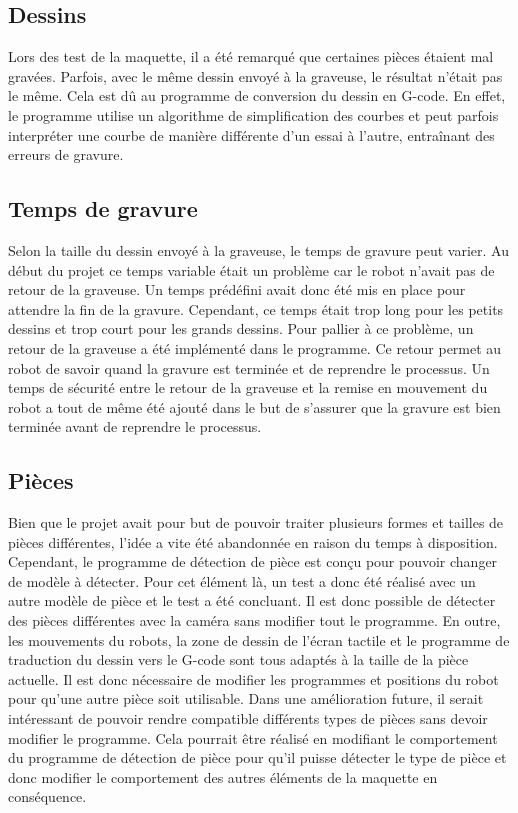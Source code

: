 \subsection{Dessins}
Lors des test de la maquette, il a été remarqué que certaines pièces étaient mal gravées. Parfois, avec le même dessin envoyé à la graveuse, le résultat n'était pas le même. Cela est dû au programme de conversion du dessin en G-code. En effet, le programme utilise un algorithme de simplification des courbes et peut parfois interpréter une courbe de manière différente d'un essai à l'autre, entraînant des erreurs de gravure.

\subsection{Temps de gravure}
Selon la taille du dessin envoyé à la graveuse, le temps de gravure peut varier. Au début du projet ce temps variable était un problème car le robot n'avait pas de retour de la graveuse. Un temps prédéfini avait donc été mis en place pour attendre la fin de la gravure. Cependant, ce temps était trop long pour les petits dessins et trop court pour les grands dessins. Pour pallier à ce problème, un retour de la graveuse a été implémenté dans le programme. Ce retour permet au robot de savoir quand la gravure est terminée et de reprendre le processus. Un temps de sécurité entre le retour de la graveuse et la remise en mouvement du robot a tout de même été ajouté dans le but de s'assurer que la gravure est bien terminée avant de reprendre le processus.

\subsection{Pièces}
Bien que le projet avait pour but de pouvoir traiter plusieurs formes et tailles de pièces différentes, l'idée a vite été abandonnée en raison du temps à disposition. Cependant, le programme de détection de pièce est conçu pour pouvoir changer de modèle à détecter. Pour cet élément là, un test a donc été réalisé avec un autre modèle de pièce et le test a été concluant. Il est donc possible de détecter des pièces différentes avec la caméra sans modifier tout le programme. En outre, les mouvements du robots, la zone de dessin de l'écran tactile et le programme de traduction du dessin vers le G-code sont tous adaptés à la taille de la pièce actuelle. Il est donc nécessaire de modifier les programmes et positions du robot pour qu'une autre pièce soit utilisable. Dans une amélioration future, il serait intéressant de pouvoir rendre compatible différents types de pièces sans devoir modifier le programme. Cela pourrait être réalisé en modifiant le comportement du programme de détection de pièce pour qu'il puisse détecter le type de pièce et donc modifier le comportement des autres éléments de la maquette en conséquence.

